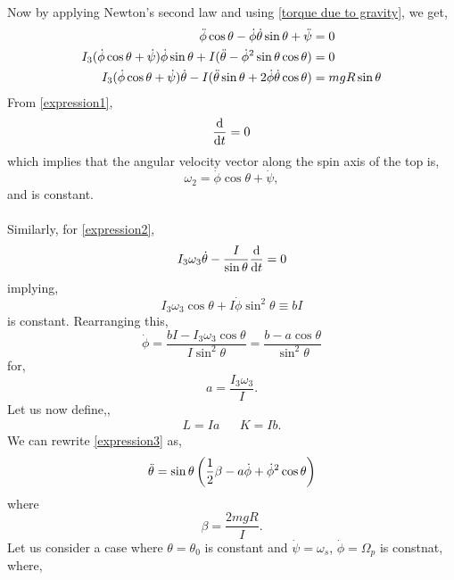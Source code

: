 \documentclass{book}
\begin{document}
Now by applying Newton's second law and using \eqref{torque due to gravity}, we get,
\begin{align}
	\Ddot{\phi}\cos\theta - \Dot{\phi}\Dot{\theta}\sin\theta + \Ddot{\psi} & = 0 \label{expression1} \\
	I_3(\Dot{\phi}\cos\theta + \Dot{\psi})\Dot{\phi}\sin\theta + I(\Ddot{\theta} - \Dot{\phi}^2\sin\theta\cos\theta) & = 0 \label{expression2} \\
	I_3(\Dot{\phi}\cos\theta + \Dot{\psi})\Dot{\theta} - I(\Ddot{\theta}\sin\theta + 2\Dot{\phi}\Dot{\theta}\cos\theta) & = mgR\sin\theta \label{expression3}
\end{align}
From \eqref{expression1},
\begin{equation}
	\dv{}{t}(\Dot{\phi} + \Dot{\psi}) = 0
\end{equation}
which implies that the angular velocity vector along the spin axis of the top is,
\begin{equation}
	\omega_2 = \Dot{\phi}\cos\theta + \Dot{\psi},
\end{equation}
and is constant.
\\\\
Similarly, for \eqref{expression2},
\begin{equation}
	I_3\omega_3\Dot{\theta} - \frac{I}{\sin\theta}\dv{}{t}(\Dot{\phi}\sin^2\theta) = 0
\end{equation}
implying,
\begin{equation}
	I_3\omega_3 \cos\theta + I\Dot{\phi}\sin^2\theta \equiv bI
\end{equation}
is constant. Rearranging this,
\begin{equation}
	\Dot{\phi} = \frac{bI - I_3 \omega_3 \cos\theta}{I\sin^2\theta} = \frac{b-a\cos\theta}{\sin^2\theta}
\end{equation}
for,
\begin{equation}
	a = \frac{I_3\omega_3}{I}.
\end{equation}
Let us now define,,
\begin{align}
	L = Ia && K = Ib. 
\end{align}
We can rewrite \eqref{expression3} as,
\begin{equation}
	\Ddot{\theta} = \sin\theta\left(\frac{1}{2}\beta - a \Dot{\phi} + \Dot{\phi}^2\cos\theta\right)
\end{equation}
where
\begin{equation}
	\beta = \frac{2mgR}{I}.
\end{equation}
Let us consider a case where $\theta = \theta_0$ is constant and $\Dot{\psi} = \omega_s$, $\Dot{\phi}=\Omega_p$ is constnat, where,
\end{document}
